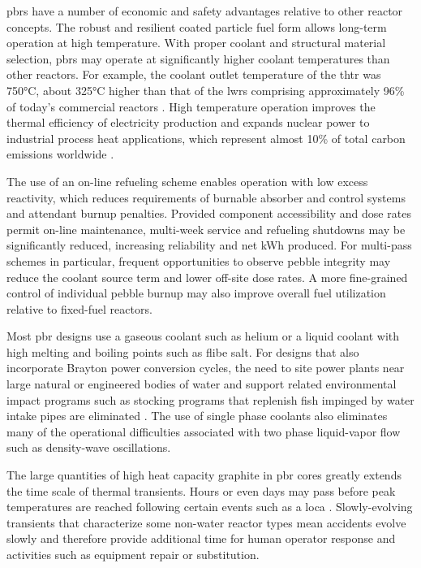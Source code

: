 \glspl{pbr} have a number of economic and safety advantages relative to other reactor concepts. The robust and resilient coated particle fuel form allows long-term operation at high temperature. With proper coolant and structural material selection, \glspl{pbr} may operate at significantly higher coolant temperatures than other reactors. For example, the coolant outlet temperature of the \gls{thtr} was 750\si{\celsius}, about 325\si{\celsius} higher than that of the \glspl{lwr} comprising approximately 96\% of today's commercial reactors \cite{reactor_count}. High temperature operation improves the thermal efficiency of electricity production and expands nuclear power to industrial process heat applications, which represent almost 10\% of total carbon emissions worldwide \cite{friedmann}.

The use of an on-line refueling scheme enables operation with low excess reactivity, which reduces requirements of burnable absorber and control systems and attendant burnup penalties. Provided component accessibility and dose rates permit on-line maintenance, multi-week service and refueling shutdowns may be significantly reduced, increasing reliability and net kWh produced. For multi-pass schemes in particular, frequent opportunities to observe pebble integrity may reduce the coolant source term and lower off-site dose rates. A more fine-grained control of individual pebble burnup may also improve overall fuel utilization relative to fixed-fuel reactors.

Most \gls{pbr} designs use a gaseous coolant such as helium or a liquid coolant with high melting and boiling points such as \gls{flibe} salt. For designs that also incorporate Brayton power conversion cycles, the need to site power plants near large natural or engineered bodies of water and support related environmental impact programs such as stocking programs that replenish fish impinged by water intake pipes are eliminated \cite{exelon_fish}. The use of single phase coolants also eliminates many of the operational difficulties associated with two phase liquid-vapor flow such as density-wave oscillations.

The large quantities of high heat capacity graphite in \gls{pbr} cores greatly extends the time scale of thermal transients. Hours or even days may pass before peak temperatures are reached following certain events such as a \gls{loca} \cite{htrpm,tyobeka}. Slowly-evolving transients that characterize some non-water reactor types mean accidents evolve slowly and therefore provide additional time for human operator response and activities such as equipment repair or substitution.

